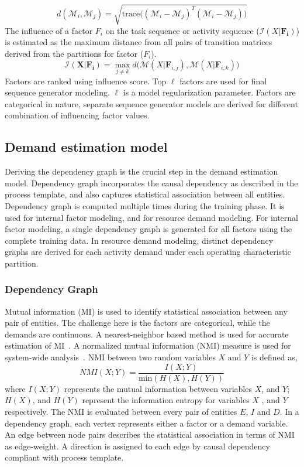 \documentclass[twoside,leqno,twocolumn]{article}
\begin{document}
\begin{equation*}
d(\mathcal{M}_i,\mathcal{M}_j) = \sqrt{\text{trace}{\Big((\mathcal{M}_i - \mathcal{M}_j)}^{T}(\mathcal{M}_i - \mathcal{M}_j)\Big)}
\end{equation*}
The influence of a factor $F_i$ on the task sequence or activity sequence ($\mathcal{I}(X\vert\mathbf{F_i} )$) is estimated as the maximum distance from all pairs of transition matrices derived from the partitions for factor ($F_i$).
\begin{equation*}
\mathcal{I}(\mathbf{X\vert F_i}) = \max_{j \neq k} d\Big(\mathcal{M}(X\vert\mathbf{F}_{i,j}), \mathcal{M}(X\vert\mathbf{F}_{i,k})\Big)
\end{equation*}  
Factors are ranked using influence score. Top $\ell$ factors are used for final sequence generator modeling. $\ell$ is a model regularization parameter. Factors are categorical in nature, separate sequence generator models are derived for different combination of influencing factor values.

\subsection{Demand estimation model}
\label{subsec:demand}
Deriving the dependency graph is the crucial step in the demand estimation model. Dependency graph incorporates the causal dependency as described in the process template, and also captures statistical association between all entities. Dependency graph is computed multiple times during the training phase. It is used for internal factor modeling, and for resource demand modeling. For internal factor modeling, a single dependency graph is generated for all factors using the complete training data. In resource demand modeling, distinct dependency graphs are derived for each activity demand under each operating characteristic partition.

\subsubsection{Dependency Graph}
\label{subsubsec:graph}
Mutual information (MI) is used to identify statistical association between any pair of entities. The challenge here is the factors are categorical, while the demands are continuous. A nearest-neighbor based method is used for accurate estimation of MI~\cite{ross_mutual_2014}. A normalized mutual information (NMI) measure is used for system-wide analysis~\cite{EstevezTPZ09}. NMI between two random variables $X$ and $Y$ is defined as, 
\begin{equation*}
NMI(X;Y)=\dfrac{I(X;Y)}{ \text{min}( H(X) , H(Y) )}
\end{equation*}
where $I(X;Y)$ represents the mutual information between variables $X$, and $Y$; $H(X)$, and $H(Y)$ represent the information entropy for variables $X$ , and $Y$ respectively. The NMI is evaluated between every pair of entities $E$, $I$ and $D$. In a dependency graph, each vertex represents either a factor or a demand variable. An edge between node pairs describes the statistical association in terms of NMI as edge-weight. A direction is assigned to each edge by causal dependency compliant with process template.
\end{document}
